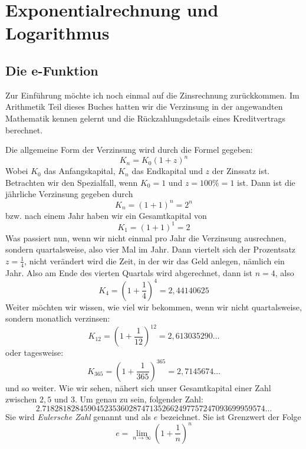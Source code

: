 
\chapter{Exponentialrechnung und Logarithmus}

\section{Die e-Funktion}

Zur Einführung möchte ich noch einmal auf die Zinsrechnung zurückkommen. Im Arithmetik Teil dieses Buches hatten wir die Verzinsung in der angewandten Mathematik kennen gelernt und die Rückzahlungsdetails eines Kreditvertrags berechnet. 

Die allgemeine Form der Verzinsung wird durch die Formel gegeben:
\begin{equation}
K_n = K_0 (1+z)^n
\end{equation}
Wobei $K_0$ das Anfangskapital, $K_n$ das Endkapital und $z$ der Zinssatz ist. Betrachten wir den Spezialfall, wenn $K_0 = 1$ und $z=100\% = 1$ ist. Dann ist die jährliche Verzinsung gegeben durch
\begin{equation}
K_n = (1+1)^n = 2^n
\end{equation}
bzw. nach einem Jahr haben wir ein Gesamtkapital von
\begin{equation}
K_1 = (1+1)^1 = 2
\end{equation}
Was passiert nun, wenn wir nicht einmal pro Jahr die Verzinsung ausrechnen, sondern quartalsweise, also vier Mal im Jahr. Dann viertelt sich der Prozentsatz $z=\frac{1}{4}$, nicht verändert wird die Zeit, in der wir das Geld anlegen, nämlich ein Jahr. Also am Ende des vierten Quartals wird abgerechnet, dann ist $n=4$, also
\begin{equation}
K_4 = \left(1+\frac{1}{4} \right)^4 = 2,44140625
\end{equation}
Weiter möchten wir wissen, wie viel wir bekommen, wenn wir nicht quartalsweise, sondern monatlich verzinsen:
\begin{equation}
K_{12} = \left(1+\frac{1}{12} \right)^{12} = 2,613035290\dots
\end{equation}
oder tagesweise:
\begin{equation}
K_{365} = \left(1+\frac{1}{365} \right)^{365} = 2,7145674\dots
\end{equation}
und so weiter. Wie wir sehen, nähert sich unser Gesamtkapital einer Zahl zwischen $2,5$ und $3$. Um genau zu sein, folgender Zahl:
\begin{equation}
2.718281828459045235360287471352662497757247093699959574\dots
\end{equation}
Sie wird \emph{Eulersche Zahl} genannt und als $e$ bezeichnet. Sie ist Grenzwert der Folge
\begin{equation}
e = \lim_{n\rightarrow \infty} \left( 1+\frac{1}{n} \right)^n
\end{equation}

